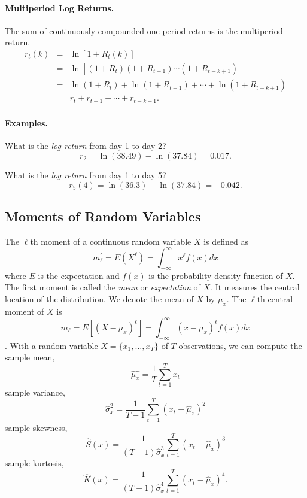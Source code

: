 \paragraph{Multiperiod Log Returns.} The sum of continuously compounded one-period returns is the multiperiod return.
\begin{eqnarray*}
r_t(k) &=& \ln[1 + R_t (k)] \\
&=& \ln[(1 + R_t )(1 + R_{t-1}) \cdots (1 + R_{t-k+1})] \\
&=& \ln(1 + R_t ) + \ln(1 + R_{t-1}) + \cdots + \ln(1 + R_{t-k+1}) \\
&=& r_t + r_{t-1} + \cdots + r_{t-k+1}.
\end{eqnarray*}

\paragraph{Examples.} What is the \emph{log return} from day 1 to day 2? 
\[
r_2 = \ln(38.49) - \ln(37.84) = 0.017.
\]

What is the \emph{log return} from day 1 to day 5? 
\[
r_5(4) = \ln(36.3) - \ln(37.84) = -0.042.
\]

\subsection{Moments of Random Variables}
The $\ell$th moment of a continuous random variable $X$ is defined as
\begin{equation}
m^{'}_{\ell}=E(X^{\ell})=\int^{\infty}_{-\infty} x^{\ell}f(x)dx
\end{equation}
where $E$ is the expectation and $f(x)$ is the probability density function of $X$. The first moment is called the \emph{mean} or \emph{expectation} of $X$. It measures the central location of the distribution. We denote the mean of $X$ by $\mu_x$. The $\ell$th central moment of $X$ is
\begin{equation}
m_{\ell}=E[(X-\mu_x)^{\ell}] = \int^{\infty}_{-\infty} (x-\mu_x)^{\ell}f(x)dx
\end{equation}
. With a random variable $X=\{x_1, \ldots, x_T\}$ of $T$ observations, we can compute the sample mean,
\begin{equation}
\hat{\mu_x}=\frac{1}{T} \sum^{T}_{t=1}x_t
\end{equation}
sample variance,
\begin{equation}
\hat{\sigma}^{2}_{x}=\frac{1}{T-1} \sum^{T}_{t=1}(x_t-\hat{\mu}_x)^2
\end{equation}
sample skewness,
\begin{equation}
\hat{S}(x)=\frac{1}{(T-1)\hat{\sigma}^3_x} \sum^{T}_{t=1}(x_t-\hat{\mu}_x)^3
\end{equation}
sample kurtosis,
\begin{equation}
\hat{K}(x)=\frac{1}{(T-1)\hat{\sigma}^4_x} \sum^{T}_{t=1}(x_t-\hat{\mu}_x)^4.
\end{equation}

